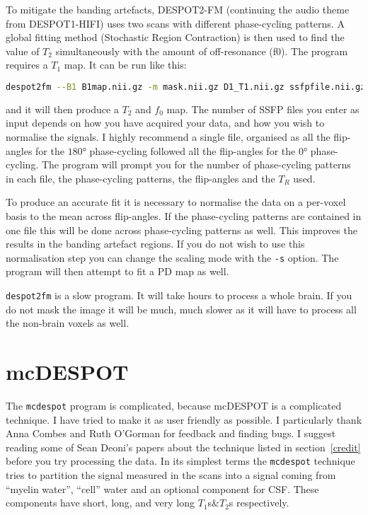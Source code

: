 \documentclass{report}
\begin{document}
To mitigate the banding artefacts, DESPOT2-FM (continuing the audio theme from DESPOT1-HIFI) uses two scans with different phase-cycling patterns. A global fitting method (Stochastic Region Contraction) is then used to find the value of $T_2$ simultaneously with the amount of off-resonance (f0). The program requires a $T_1$ map. It can be run like this:
\begin{lstlisting}[language=sh]
despot2fm --B1 B1map.nii.gz -m mask.nii.gz D1_T1.nii.gz ssfpfile.nii.gz
\end{lstlisting}
and it will then produce a $T_2$ and $f_0$ map. The number of SSFP files you enter as input depends on how you have acquired your data, and how you wish to normalise the signals. I highly recommend a single file, organised as all the flip-angles for the $180\si{\degree}$ phase-cycling followed all the flip-angles for the $0\si{\degree}$ phase-cycling. The program will prompt you for the number of phase-cycling patterns in each file, the phase-cycling patterns, the flip-angles and the $T_R$ used.

To produce an accurate fit it is necessary to normalise the data on a per-voxel basis to the mean across flip-angles. If the phase-cycling patterns are contained in one file this will be done across phase-cycling patterns as well. This improves the results in the banding artefact regions. If you do not wish to use this normalisation step you can change the scaling mode with the \texttt{-s} option. The program will then attempt to fit a PD map as well.

\texttt{despot2fm} is a slow program. It will take hours to process a whole brain. If you do not mask the image it will be much, much slower as it will have to process all the non-brain voxels as well.

\section{mcDESPOT}

The \texttt{mcdespot} program is complicated, because mcDESPOT is a complicated technique. I have tried to make it as user friendly as possible. I particularly thank Anna Combes and Ruth O'Gorman for feedback and finding bugs. I suggest reading some of Sean Deoni's papers about the technique listed in section~\ref{credit} before you try processing the data. In its simplest terms the \texttt{mcdespot} technique tries to partition the signal measured in the scans into a signal coming from ``myelin water'', ``cell'' water and an optional component for CSF. These components have short, long, and very long $T_1$s\&$T_2$s respectively.
\end{document}
